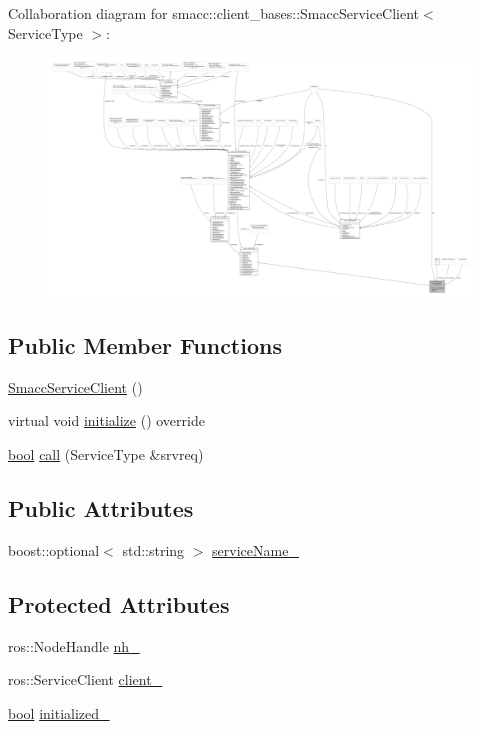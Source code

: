 Collaboration diagram for smacc\+:\+:client\+\_\+bases\+:\+:Smacc\+Service\+Client$<$ Service\+Type $>$\+:
\nopagebreak
\begin{figure}[H]
\begin{center}
\leavevmode
\includegraphics[width=350pt]{classsmacc_1_1client__bases_1_1SmaccServiceClient__coll__graph}
\end{center}
\end{figure}
\subsection*{Public Member Functions}
\begin{DoxyCompactItemize}
\item 
\hyperlink{classsmacc_1_1client__bases_1_1SmaccServiceClient_ab041a903fa40cb5df251f0cd437604cc}{Smacc\+Service\+Client} ()
\item 
virtual void \hyperlink{classsmacc_1_1client__bases_1_1SmaccServiceClient_aa51b80828e4ab19627210440ae15b6f3}{initialize} () override
\item 
\hyperlink{classbool}{bool} \hyperlink{classsmacc_1_1client__bases_1_1SmaccServiceClient_a0e9914f45f1091c38bb9ad6187d07977}{call} (Service\+Type \&srvreq)
\end{DoxyCompactItemize}
\subsection*{Public Attributes}
\begin{DoxyCompactItemize}
\item 
boost\+::optional$<$ std\+::string $>$ \hyperlink{classsmacc_1_1client__bases_1_1SmaccServiceClient_a63732ec406cb8b6f65bbdbb73e01c7ab}{service\+Name\+\_\+}
\end{DoxyCompactItemize}
\subsection*{Protected Attributes}
\begin{DoxyCompactItemize}
\item 
ros\+::\+Node\+Handle \hyperlink{classsmacc_1_1client__bases_1_1SmaccServiceClient_afb62982383b8269c7962cd1588537489}{nh\+\_\+}
\item 
ros\+::\+Service\+Client \hyperlink{classsmacc_1_1client__bases_1_1SmaccServiceClient_a632093eb6bc8b058dec492b21c8536f9}{client\+\_\+}
\item 
\hyperlink{classbool}{bool} \hyperlink{classsmacc_1_1client__bases_1_1SmaccServiceClient_ad36816c62fc14380a6d0782a2592a5b4}{initialized\+\_\+}
\end{DoxyCompactItemize}
